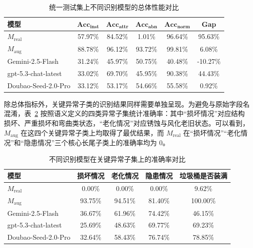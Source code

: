 \begin{table}[htbp]
\centering
\caption{统一测试集上不同识别模型的总体性能对比}
\label{tab:recognition_main_results}
\begin{tabular}{lccccc}
\toprule
\textbf{模型} & $\mathbf{Acc_{inst}}$ & $\mathbf{Acc_{attr}}$ & $\mathbf{Acc_{abn}}$ & $\mathbf{Acc_{norm}}$ & \textbf{Gap}\\
\midrule
$M_{\mathrm{real}}$ & 57.97\% & 84.52\% & 1.01\% & 96.64\% & 95.63\%\\
$M_{\mathrm{aug}}$ & 88.78\% & 96.12\% & 93.72\% & 99.81\% & 6.08\%\\
Gemini-2.5-Flash & 31.24\% & 45.97\% & 50.75\% & 40.48\% & -10.27\%\\
gpt-5.3-chat-latest & 33.02\% & 69.70\% & 45.95\% & 90.38\% & 44.43\%\\
Doubao-Seed-2.0-Pro & 33.12\% & 53.17\% & 54.66\% & 55.58\% & 0.92\%\\
\bottomrule
\end{tabular}
\end{table}

除总体指标外，关键异常子类的识别结果同样需要单独呈现。为避免与原始字段名混淆，表~\ref{tab:recognition_key_attr_results} 按照语义定义的四类异常子集统计准确率：其中“损坏情况”对应结构损坏、严重损坏和弯曲类状态，“老化情况”对应锈蚀与风化老旧状态。可以看到，$M_{\mathrm{aug}}$ 在这四个关键异常子类上均取得了最优结果，而 $M_{\mathrm{real}}$ 在“损坏情况”“老化情况”和“隐患情况”三个核心长尾子类上的准确率均为 0。

\begin{table}[htbp]
\centering
\caption{不同识别模型在关键异常子集上的准确率对比}
\label{tab:recognition_key_attr_results}
\begin{tabular}{lcccc}
\toprule
\textbf{模型} & \textbf{损坏情况} & \textbf{老化情况} & \textbf{隐患情况} & \textbf{垃圾桶是否装满}\\
\midrule
$M_{\mathrm{real}}$ & 0.00\% & 0.00\% & 0.00\% & 9.62\%\\
$M_{\mathrm{aug}}$ & 93.75\% & 94.51\% & 81.40\% & 100.00\%\\
Gemini-2.5-Flash & 36.67\% & 61.96\% & 74.42\% & 46.15\%\\
gpt-5.3-chat-latest & 25.69\% & 48.63\% & 69.77\% & 69.23\%\\
Doubao-Seed-2.0-Pro & 32.64\% & 58.43\% & 76.74\% & 78.85\%\\
\bottomrule
\end{tabular}
\end{table}

